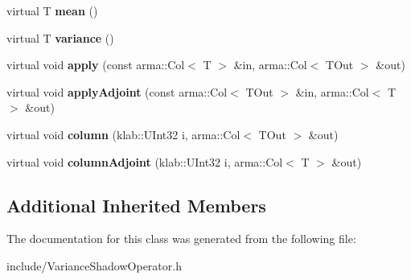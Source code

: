 \begin{DoxyCompactItemize}
\item 
virtual T {\bfseries mean} ()\hypertarget{classkl1p_1_1TVarianceShadowOperator_a17b25dcac800f2e8b6f18c666d7409dc}{}\label{classkl1p_1_1TVarianceShadowOperator_a17b25dcac800f2e8b6f18c666d7409dc}

\item 
virtual T {\bfseries variance} ()\hypertarget{classkl1p_1_1TVarianceShadowOperator_aaee510622b4790173b3a9a866ccaa9ca}{}\label{classkl1p_1_1TVarianceShadowOperator_aaee510622b4790173b3a9a866ccaa9ca}

\item 
virtual void {\bfseries apply} (const arma\+::\+Col$<$ T $>$ \&in, arma\+::\+Col$<$ T\+Out $>$ \&out)\hypertarget{classkl1p_1_1TVarianceShadowOperator_a64afea2651c9fe3d302e536130ab5985}{}\label{classkl1p_1_1TVarianceShadowOperator_a64afea2651c9fe3d302e536130ab5985}

\item 
virtual void {\bfseries apply\+Adjoint} (const arma\+::\+Col$<$ T\+Out $>$ \&in, arma\+::\+Col$<$ T $>$ \&out)\hypertarget{classkl1p_1_1TVarianceShadowOperator_adaf769ac891d8e668504b6788265dd0f}{}\label{classkl1p_1_1TVarianceShadowOperator_adaf769ac891d8e668504b6788265dd0f}

\item 
virtual void {\bfseries column} (klab\+::\+U\+Int32 i, arma\+::\+Col$<$ T\+Out $>$ \&out)\hypertarget{classkl1p_1_1TVarianceShadowOperator_a88b3abadec5fcc40e762e8ab74255594}{}\label{classkl1p_1_1TVarianceShadowOperator_a88b3abadec5fcc40e762e8ab74255594}

\item 
virtual void {\bfseries column\+Adjoint} (klab\+::\+U\+Int32 i, arma\+::\+Col$<$ T $>$ \&out)\hypertarget{classkl1p_1_1TVarianceShadowOperator_a9291bd0fdead7da0c22be4be9dc4e8f4}{}\label{classkl1p_1_1TVarianceShadowOperator_a9291bd0fdead7da0c22be4be9dc4e8f4}

\end{DoxyCompactItemize}
\subsection*{Additional Inherited Members}


The documentation for this class was generated from the following file\+:\begin{DoxyCompactItemize}
\item 
include/Variance\+Shadow\+Operator.\+h\end{DoxyCompactItemize}
